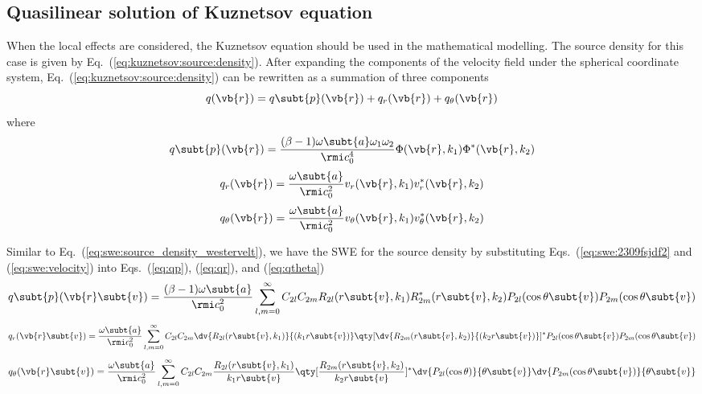 \subsection{Quasilinear solution of Kuznetsov equation}
\label{sec:predict_swe_kuz}
When the local effects are considered, the Kuznetsov equation should be used in the mathematical modelling.
The source density for this case is given by Eq.~(\ref{eq:kuznetsov:source:density}).
After expanding the components of the velocity field under the spherical coordinate system, 
 Eq.~(\ref{eq:kuznetsov:source:density}) can be rewritten as a summation of three components
 \begin{equation}
     q(\vb{r}) = q\subt{p}(\vb{r})+ q_r(\vb{r}) + q_\theta(\vb{r})
     \label{eq:2389fjwds239wdof}
 \end{equation}
 where 
 \begin{equation}
     q\subt{p}(\vb{r}) = \frac{(\beta-1)\omega\subt{a}\omega_1\omega_2}{\rmi c_0^4}
     \Phi(\vb{r}, k_1) \Phi^*(\vb{r},k_2)
     \label{eq:qp}
 \end{equation}
 \begin{equation}
     q_r(\vb{r} ) =
     \frac{\omega\subt{a}}{\rmi c_0^2}
     v_r(\vb{r},k_1)v_r^*(\vb{r},k_2)
     \label{eq:qr}
 \end{equation}
 \begin{equation}
     q_\theta(\vb{r})
     =
     \frac{\omega\subt{a}}{\rmi c_0^2}
     v_\theta (\vb{r},k_1) v_\theta^*(\vb{r},k_2)
     \label{eq:qtheta}
 \end{equation}

 Similar to Eq.~(\ref{eq:swe:source_density_westervelt}), we have the SWE for the source density by substituting Eqs.~(\ref{eq:swe:2309fsjdf2} and (\ref{eq:swe:velocity}) into Eqs.~(\ref{eq:qp}), (\ref{eq:qr}), and (\ref{eq:qtheta})
\begin{equation}
 q\subt{p}(\vb{r}\subt{v})
=
\frac{(\beta-1) \omega\subt{a}}{\rmi c_0^2}
\sum_{l,m=0}^\infty
C_{2l} C_{2m}
R_{2l}(r\subt{v},k_1)
R_{2m}^*(r\subt{v},k_2)
P_{2l}(\cos\theta\subt{v})
P_{2m}(\cos\theta\subt{v})
\label{eq:swe:source_density_kuznetsov}
\end{equation}
\begin{equation}
    q_r(\vb{r}\subt{v})
    =
    \frac{\omega\subt{a}}{\rmi c_0^2}
    \sum_{l,m=0}^\infty 
    C_{2l}C_{2m}
    \dv{R_{2l}(r\subt{v},k_1) }{(k_1r\subt{v})}
    \qty[\dv{R_{2m}(r\subt{v},k_2)}{(k_2r\subt{v})}]^* P_{2l}(\cos\theta\subt{v})
    P_{2m}(\cos\theta\subt{v})
\end{equation}
\begin{equation}
    q_\theta(\vb{r}\subt{v})
    =
    \frac{\omega\subt{a}}{\rmi c_0^2}
    \sum_{l,m=0}^\infty 
    C_{2l}C_{2m}
    \frac{R_{2l}(r\subt{v},k_1) }{k_1r\subt{v}}
    \qty[\frac{R_{2m}(r\subt{v},k_2)}{k_2r\subt{v}}]^*
    \dv{P_{2l}(\cos\theta)}{\theta\subt{v}}
    \dv{P_{2m}(\cos\theta\subt{v})}{\theta\subt{v}}
\end{equation}

